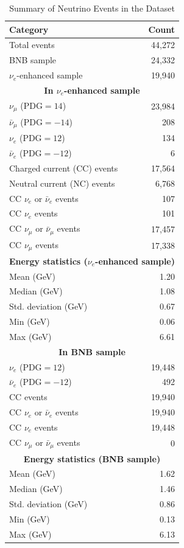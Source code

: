 \documentclass{pracalicmgr}
\begin{document}
\begin{table}[h]
\centering
\caption{Summary of Neutrino Events in the Dataset}
\begin{tabular}{|l|r|}
\hline
\textbf{Category} & \textbf{Count} \\
\hline
Total events & 44,272 \\
BNB sample & 24,332 \\
$\nu_e$-enhanced sample & 19,940 \\
\hline
\multicolumn{2}{|c|}{\textbf{In $\nu_e$-enhanced sample}} \\
\hline
$\nu_{\mu}$ ($\text{PDG}=14$) & 23,984 \\
$\bar{\nu}_{\mu}$ ($\text{PDG}=-14$) & 208 \\
$\nu_e$ ($\text{PDG}=12$) & 134 \\
$\bar{\nu}_e$ ($\text{PDG}=-12$) & 6 \\
Charged current (CC) events & 17,564 \\
Neutral current (NC) events & 6,768 \\
CC $\nu_e$ or $\bar{\nu}_e$ events & 107 \\
CC $\nu_e$ events & 101 \\
CC $\nu_{\mu}$ or $\bar{\nu}_{\mu}$ events & 17,457 \\
CC $\nu_{\mu}$ events & 17,338 \\
\hline
\multicolumn{2}{|c|}{\textbf{Energy statistics ($\nu_e$-enhanced sample)}} \\
\hline
Mean (GeV) & 1.20 \\
Median (GeV) & 1.08 \\
Std. deviation (GeV) & 0.67 \\
Min (GeV) & 0.06 \\
Max (GeV) & 6.61 \\
\hline
\multicolumn{2}{|c|}{\textbf{In BNB sample}} \\
\hline
$\nu_e$ ($\text{PDG}=12$) & 19,448 \\
$\bar{\nu}_e$ ($\text{PDG}=-12$) & 492 \\
CC events & 19,940 \\
CC $\nu_e$ or $\bar{\nu}_e$ events & 19,940 \\
CC $\nu_e$ events & 19,448 \\
CC $\nu_{\mu}$ or $\bar{\nu}_{\mu}$ events & 0 \\
\hline
\multicolumn{2}{|c|}{\textbf{Energy statistics (BNB sample)}} \\
\hline
Mean (GeV) & 1.62 \\
Median (GeV) & 1.46 \\
Std. deviation (GeV) & 0.86 \\
Min (GeV) & 0.13 \\
Max (GeV) & 6.13 \\
\hline
\end{tabular}
\end{table}
\end{document}

